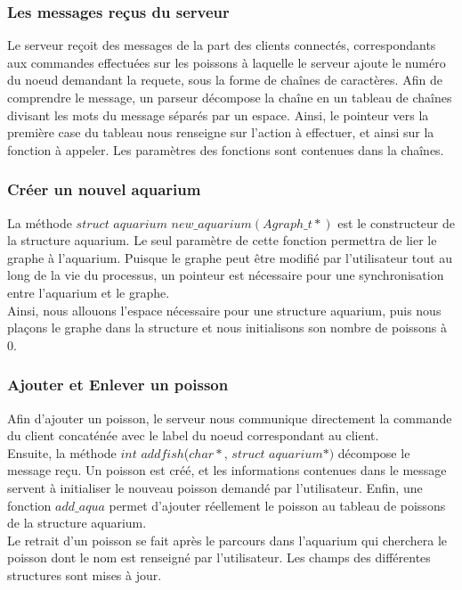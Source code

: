 \subsubsection{Les messages reçus du serveur}
\indent Le serveur reçoit des messages de la part des clients connectés, correspondants aux commandes effectuées sur les poissons à laquelle le serveur ajoute le numéro du noeud demandant la requete, sous la forme de chaînes de caractères. Afin de comprendre le message, un parseur décompose la chaîne en un tableau de chaînes divisant les mots du message séparés par un espace. Ainsi, le pointeur vers la première case du tableau nous renseigne sur l'action à effectuer, et ainsi sur la fonction à appeler. Les paramètres des fonctions sont contenues dans la chaînes.

\subsubsection{Créer un nouvel aquarium}

\indent La méthode $struct$ $aquarium$ $new\_aquarium(Agraph\_t*)$ est le constructeur de la structure aquarium. Le seul paramètre de cette fonction permettra de lier le graphe à l'aquarium. Puisque le graphe peut être modifié par l'utilisateur tout au long de la vie du processus, un pointeur est nécessaire pour une synchronisation entre l'aquarium et le graphe. \\
\indent Ainsi, nous allouons l'espace nécessaire pour une structure aquarium, puis nous plaçons le graphe dans la structure et nous initialisons son nombre de poissons à 0.

\subsubsection{Ajouter et Enlever un poisson}

\indent Afin d'ajouter un poisson, le serveur nous communique directement la commande du client concaténée avec le label du noeud correspondant au client. \\Ensuite, la méthode $int$ $addfish$($char*$,  $struct$ $aquarium*)$ décompose le message reçu. Un poisson est créé, et les informations contenues dans le message servent à initialiser le nouveau poisson demandé par l'utilisateur. Enfin, une fonction $add\_aqua$ permet d'ajouter réellement le poisson au tableau de poissons de la structure aquarium. \\
\indent Le retrait d'un poisson se fait après le parcours dans l'aquarium qui cherchera le poisson dont le nom est renseigné par l'utilisateur. Les champs des différentes structures sont mises à jour.


